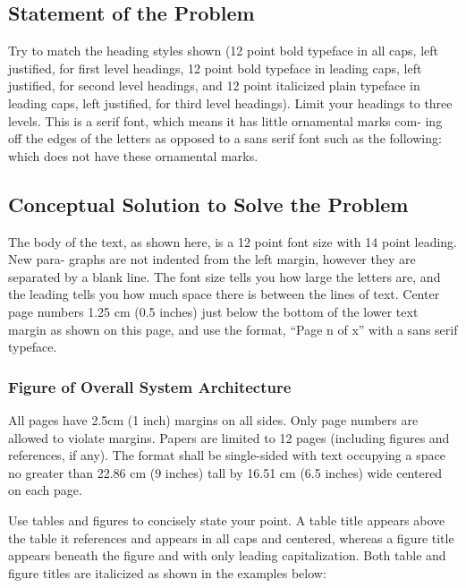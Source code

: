 \documentclass[12pt, letterpaper]{article}
\begin{document}
\subsection{Statement of the Problem}
Try to match the heading styles shown (12 point bold typeface in all caps, left justified, for first level headings, 12 point bold typeface in leading caps, left justified, for second level headings, and 12 point italicized plain typeface in leading caps, left justified, for third level headings). Limit your headings to three levels. This is a serif font, which means it has little ornamental marks com- ing off the edges of the letters as opposed to a sans serif font such as the following: which does not have these ornamental marks.

\subsection{Conceptual Solution to Solve the Problem}
The body of the text, as shown here, is a 12 point font size with 14 point leading. New para- graphs are not indented from the left margin, however they are separated by a blank line. The font size tells you how large the letters are, and the leading tells you how much space there is between the lines of text. Center page numbers 1.25 cm (0.5 inches) just below the bottom of the lower text margin as shown on this page, and use the format, “Page n of x” with a sans serif typeface.

\subsubsection{Figure of Overall System Architecture}
All pages have 2.5cm (1 inch) margins on all sides. Only page numbers are allowed to violate margins. Papers are limited to 12 pages (including figures and references, if any). The format shall be single-sided with text occupying a space no greater than 22.86 cm (9 inches) tall by 16.51 cm (6.5 inches) wide centered on each page.

Use tables and figures to concisely state your point. A table title appears above the table it references and appears in all caps and centered, whereas a figure title appears beneath the figure and with only leading capitalization. Both table and figure titles are italicized as shown in the examples below:
\end{document}
